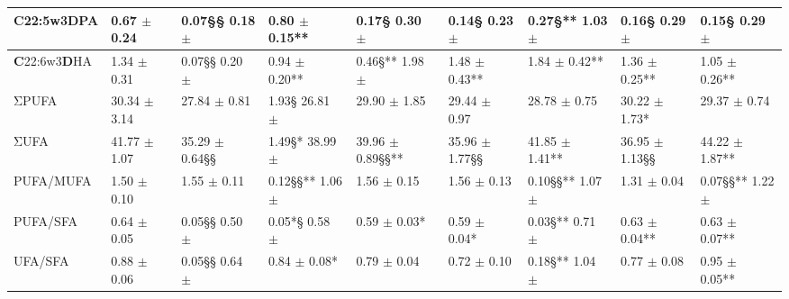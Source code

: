 \documentclass[11pt]{article}
\begin{document}
\begin{table}
\begin{tabular}{|l|l|l|l|l|l|l|l|l|}
\hline
\textbf{C}22:5w3\textbf{D}PA & 0.67 $\pm$ 0.24 & 0.07§§ 0.18 $\pm$ & 0.80 $\pm$ 0.15** & 0.17§ 0.30 $\pm$ & 0.14§ 0.23 $\pm$ & 0.27§** 1.03 $\pm$ & 0.16§ 0.29 $\pm$ & 0.15§ 0.29 $\pm$ \\
\hline
\textbf{C}22:6w3\textbf{D}HA & 1.34 $\pm$ 0.31 & 0.07§§ 0.20 $\pm$ & 0.94 $\pm$ 0.20** & 0.46§** 1.98 $\pm$ & 1.48 $\pm$ 0.43** & 1.84 $\pm$ 0.42** & 1.36 $\pm$ 0.25** & 1.05 $\pm$ 0.26** \\
\hline
ΣPUFA & 30.34 $\pm$ 3.14 & 27.84 $\pm$ 0.81 & 1.93§ 26.81 $\pm$ & 29.90 $\pm$ 1.85 & 29.44 $\pm$ 0.97 & 28.78 $\pm$ 0.75 & 30.22 $\pm$ 1.73* & 29.37 $\pm$ 0.74 \\
\hline
ΣUFA & 41.77 $\pm$ 1.07 & 35.29 $\pm$ 0.64§§ & 1.49§* 38.99 $\pm$ & 39.96 $\pm$ 0.89§§** & 35.96 $\pm$ 1.77§§ & 41.85 $\pm$ 1.41** & 36.95 $\pm$ 1.13§§ & 44.22 $\pm$ 1.87** \\
\hline
PUFA/MUFA & 1.50 $\pm$ 0.10 & 1.55 $\pm$ 0.11 & 0.12§§** 1.06 $\pm$ & 1.56 $\pm$ 0.15 & 1.56 $\pm$ 0.13 & 0.10§§** 1.07 $\pm$ & 1.31 $\pm$ 0.04 & 0.07§§** 1.22 $\pm$ \\
\hline
PUFA/SFA & 0.64 $\pm$ 0.05 & 0.05§§ 0.50 $\pm$ & 0.05*§ 0.58 $\pm$ & 0.59 $\pm$ 0.03* & 0.59 $\pm$ 0.04* & 0.03§** 0.71 $\pm$ & 0.63 $\pm$ 0.04** & 0.63 $\pm$ 0.07** \\
\hline
UFA/SFA & 0.88 $\pm$ 0.06 & 0.05§§ 0.64 $\pm$ & 0.84 $\pm$ 0.08* & 0.79 $\pm$ 0.04 & 0.72 $\pm$ 0.10 & 0.18§** 1.04 $\pm$ & 0.77 $\pm$ 0.08 & 0.95 $\pm$ 0.05** \\
\hline
\end{tabular}
\end{table}
\end{document}
